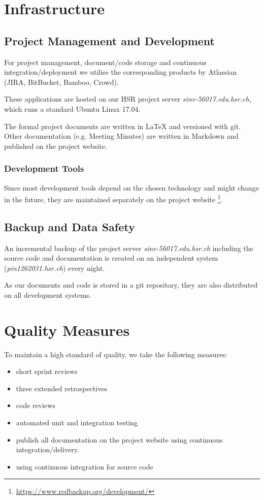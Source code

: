 \documentclass[a4paper]{article}
\begin{document}
\section{Infrastructure}


\subsection{Project Management and Development}

For project management, document/code storage and continuous integration/deployment we utilise the corresponding products by Atlassian (JIRA, BitBucket, Bamboo, Crowd)\cite{atlassian-opensource}.

These applications are hosted on our HSR project server \textit{sinv-56017.edu.hsr.ch}, which runs a standard Ubuntu Linux 17.04.

The formal project documents are written in LaTeX and versioned with git. Other documentation (e.g. Meeting Minutes) are written in Markdown and published on the project website.

\subsubsection{Development Tools}

Since most development tools depend on the chosen technology and might change in the future, they are maintained separately on the project website \footnote{\url{https://www.redbackup.org/development/}}.

\subsection{Backup and Data Safety}

An incremental backup of the project server \textit{sinv-56017.edu.hsr.ch} including the source code and documentation is created on an independent system (\textit{pin1262031.hsr.ch}) every night.

As our documents and code is stored in a git repository, they are also distributed on all development systems.



\section{Quality Measures}
To maintain a high standard of quality, we take the following measures:

\begin{multicols}{2}
	\begin{itemize}
	    \item short sprint reviews
	    \item three extended retrospectives
	    \item code reviews
	    \item automated unit and integration testing
	    \item publish all documentation on the project website using continuous integration/delivery.
	    \item using continuous integration for source code
	\end{itemize}
\end{multicols}
\end{document}
